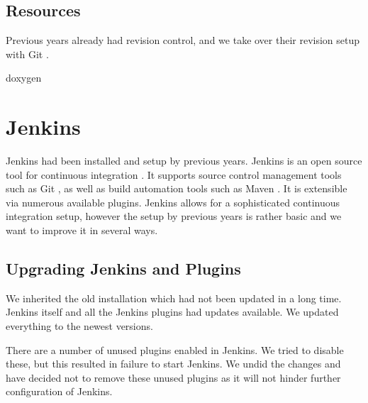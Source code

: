 \subsection{Resources}
Previous years already had revision control, and we take over their revision setup with Git \parencite{gitwebsite}. 

doxygen

\section{Jenkins}\label{sec:jenkins}
Jenkins had been installed and setup by previous years. Jenkins is an open source tool for continuous integration \parencite{JenkinsWebsite}. It supports source control management tools such as Git \parencite{gitwebsite}, as well as build automation tools such as Maven \parencite{mavenwebsite}. It is extensible via numerous available plugins. Jenkins allows for a sophisticated continuous integration setup, however the setup by previous years is rather basic and we want to improve it in several ways.


\subsection{Upgrading Jenkins and Plugins}
We inherited the old installation which had not been updated in a long time. Jenkins itself and all the Jenkins plugins had updates available. We updated everything to the newest versions.

There are a number of unused plugins enabled in Jenkins. We tried to disable these, but this resulted in failure to start Jenkins. We undid the changes and have decided not to remove these unused plugins as it will not hinder further configuration of Jenkins.

